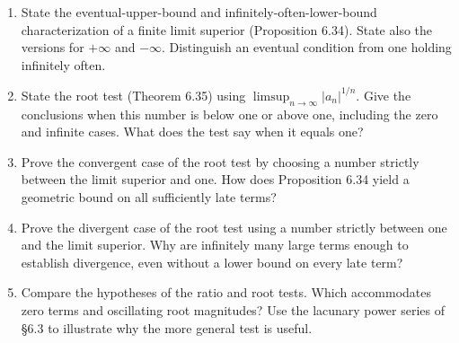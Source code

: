 \begin{enumerate}[resume]
  \item State the eventual-upper-bound and infinitely-often-lower-bound
    characterization of a finite limit superior (Proposition 6.34).
    State also the versions for \(+\infty\) and \(-\infty\).
    Distinguish an eventual condition from one holding infinitely often.

  \item State the root test (Theorem 6.35) using
    \(\limsup_{n\to\infty}|a_n|^{1/n}\).
    Give the conclusions when this number is below one or above
    one, including the zero and infinite cases. What does the test
    say when it equals one?

  \item Prove the convergent case of the root test by choosing a
    number strictly between the limit superior and one.
    How does Proposition 6.34 yield a geometric bound on all
    sufficiently late terms?

  \item Prove the divergent case of the root test using a number
    strictly between one and the limit superior.
    Why are infinitely many large terms enough to establish
    divergence, even without a lower bound on every late term?

  \item Compare the hypotheses of the ratio and root tests.
    Which accommodates zero terms and oscillating root magnitudes?
    Use the lacunary power series of \S6.3 to illustrate why the
    more general test is useful.
\end{enumerate}
